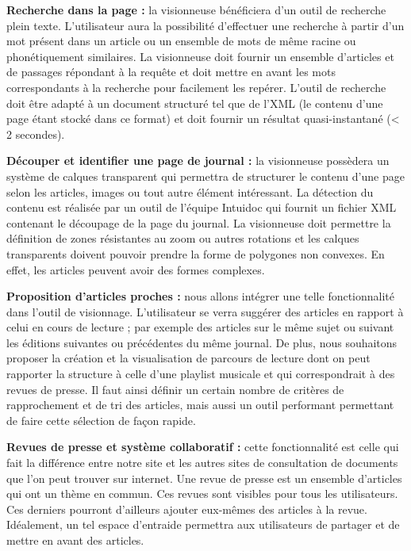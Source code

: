     \textbf{Recherche dans la page :} la visionneuse bénéficiera d'un outil de recherche plein texte. L'utilisateur aura la possibilité
    d’effectuer une recherche à partir d’un mot présent dans un article ou un ensemble de mots de même racine ou phonétiquement similaires.
    La visionneuse doit fournir un ensemble d’articles et de passages répondant à la requête et doit mettre en avant les mots correspondants à la recherche pour facilement les repérer.
    L’outil de recherche doit être adapté à un document structuré tel que de l’XML (le contenu d’une page étant stocké dans ce format) et doit fournir
    un résultat quasi-instantané (< 2 secondes).


    \textbf{Découper et identifier une page de journal :} la visionneuse possèdera un système de calques transparent qui permettra de structurer le contenu d’une page selon les articles, images ou tout autre élément intéressant. La détection du contenu est réalisée par un outil de l’équipe Intuidoc qui fournit un
    fichier XML contenant le découpage de la page du journal. La visionneuse doit permettre la définition de zones résistantes au zoom ou autres
    rotations et les calques transparents doivent pouvoir prendre la forme de polygones non convexes. En effet, les articles peuvent avoir des formes complexes.


    \textbf{Proposition d’articles proches :} nous allons intégrer une telle fonctionnalité dans l’outil de visionnage. L'utilisateur se verra
    suggérer des articles en rapport à celui en cours de lecture ; par exemple des articles sur le même sujet ou suivant les éditions suivantes ou précédentes
    du même journal. De plus, nous souhaitons proposer la création et la visualisation de parcours de lecture dont on peut rapporter la structure
    à celle d’une playlist musicale et qui correspondrait à des revues de presse. Il faut ainsi définir un certain nombre de critères de rapprochement
    et de tri des articles, mais aussi un outil performant permettant de faire cette sélection de façon rapide.

    \textbf{Revues de presse et système collaboratif :} cette fonctionnalité est celle qui fait la différence entre notre site et les autres sites de consultation de documents que l'on peut trouver sur internet. Une revue de presse est un ensemble d'articles qui ont un thème en commun. Ces revues sont visibles pour tous les utilisateurs. Ces derniers pourront d'ailleurs ajouter eux-mêmes des articles à la revue. Idéalement, un tel espace d’entraide permettra aux utilisateurs de partager et de mettre en avant des articles.
		
